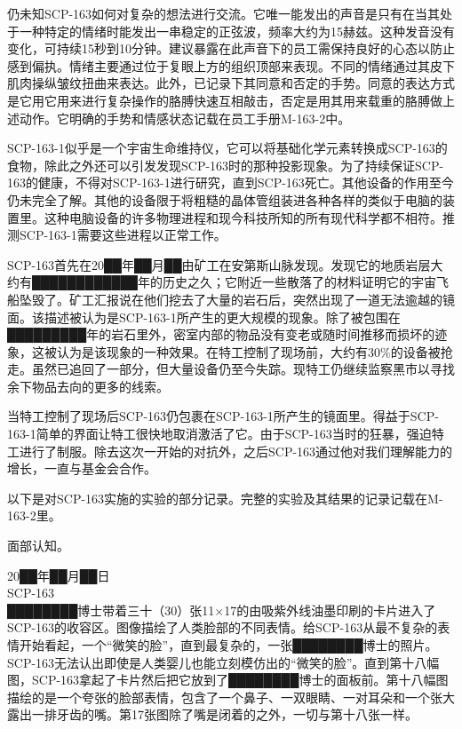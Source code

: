 仍未知SCP-163如何对复杂的想法进行交流。它唯一能发出的声音是只有在当其处于一种特定的情绪时能发出一串稳定的正弦波，频率大约为15赫兹。这种发音没有变化，可持续15秒到10分钟。建议暴露在此声音下的员工需保持良好的心态以防止感到偏执。情绪主要通过位于复眼上方的组织顶部来表现。不同的情绪通过其皮下肌肉操纵皱纹扭曲来表达。此外，已记录下其同意和否定的手势。同意的表达方式是它用它用来进行复杂操作的胳膊快速互相敲击，否定是用其用来载重的胳膊做上述动作。它明确的手势和情感状态记载在员工手册M-163-2中。

SCP-163-1似乎是一个宇宙生命维持仪，它可以将基础化学元素转换成SCP-163的食物，除此之外还可以引发发现SCP-163时的那种投影现象。为了持续保证SCP-163的健康，不得对SCP-163-1进行研究，直到SCP-163死亡。其他设备的作用至今仍未完全了解。其他的设备限于将粗糙的晶体管组装进各种各样的类似于电脑的装置里。这种电脑设备的许多物理进程和现今科技所知的所有现代科学都不相符。推测SCP-163-1需要这些进程以正常工作。

SCP-163首先在20██年██月██由矿工在安第斯山脉发现。发现它的地质岩层大约有████████████年的历史之久；它附近一些散落了的材料证明它的宇宙飞船坠毁了。矿工汇报说在他们挖去了大量的岩石后，突然出现了一道无法逾越的镜面。该描述被认为是SCP-163-1所产生的更大规模的现象。除了被包围在█████████年的岩石里外，密室内部的物品没有变老或随时间推移而损坏的迹象，这被认为是该现象的一种效果。在特工控制了现场前，大约有30\%的设备被抢走。虽然已追回了一部分，但大量设备仍至今失踪。现特工仍继续监察黑市以寻找余下物品去向的更多的线索。

当特工控制了现场后SCP-163仍包裹在SCP-163-1所产生的镜面里。得益于SCP-163-1简单的界面让特工很快地取消激活了它。由于SCP-163当时的狂暴，强迫特工进行了制服。除去这次一开始的对抗外，之后SCP-163通过他对我们理解能力的增长，一直与基金会合作。

以下是对SCP-163实施的实验的部分记录。完整的实验及其结果的记录记载在M-163-2里。

面部认知。

20██年██月██日\\
SCP-163\\
████████博士带着三十（30）张11×17的由吸紫外线油墨印刷的卡片进入了SCP-163的收容区。图像描绘了人类脸部的不同表情。给SCP-163从最不复杂的表情开始看起，一个“微笑的脸”，直到最复杂的，一张████████博士的照片。\\
SCP-163无法认出即使是人类婴儿也能立刻模仿出的“微笑的脸”。直到第十八幅图，SCP-163拿起了卡片然后把它放到了████████博士的面板前。第十八幅图描绘的是一个夸张的脸部表情，包含了一个鼻子、一双眼睛、一对耳朵和一个张大露出一排牙齿的嘴。第17张图除了嘴是闭着的之外，一切与第十八张一样。

